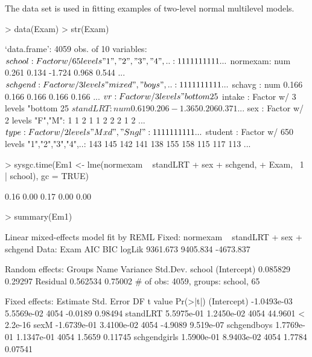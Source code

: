 \documentclass[12pt]{article}
\begin{document}
The  data set is used in fitting examples of two-level
normal multilevel models.
\begin{Schunk}
\begin{Sinput}
> data(Exam)
> str(Exam)
\end{Sinput}
\begin{Soutput}
`data.frame':	4059 obs. of  10 variables:
 $ school  : Factor w/ 65 levels "1","2","3","4",..: 1 1 1 1 1 1 1 1 1 1 ...
 $ normexam: num   0.261  0.134 -1.724  0.968  0.544 ...
 $ schgend : Factor w/ 3 levels "mixed","boys",..: 1 1 1 1 1 1 1 1 1 1 ...
 $ schavg  : num  0.166 0.166 0.166 0.166 0.166 ...
 $ vr      : Factor w/ 3 levels "bottom 25%","mi..",..: 2 2 2 2 2 2 2 2 2 2 ...
 $ intake  : Factor w/ 3 levels "bottom 25%","mi..",..: 1 2 3 2 2 1 3 2 2 3 ...
 $ standLRT: num   0.619  0.206 -1.365  0.206  0.371 ...
 $ sex     : Factor w/ 2 levels "F","M": 1 1 2 1 1 2 2 2 1 2 ...
 $ type    : Factor w/ 2 levels "Mxd","Sngl": 1 1 1 1 1 1 1 1 1 1 ...
 $ student : Factor w/ 650 levels "1","2","3","4",..: 143 145 142 141 138 155 158 115 117 113 ...
\end{Soutput}
\begin{Sinput}
> sysgc.time(Em1 <- lme(normexam ~ standLRT + sex + schgend, 
+     Exam, ~1 | school), gc = TRUE)
\end{Sinput}
\begin{Soutput}
[1] 0.16 0.00 0.17 0.00 0.00
\end{Soutput}
\begin{Sinput}
> summary(Em1)
\end{Sinput}
\begin{Soutput}
Linear mixed-effects model fit by REML
Fixed: normexam ~ standLRT + sex + schgend 
 Data: Exam 
      AIC      BIC    logLik
 9361.673 9405.834 -4673.837

Random effects:
 Groups   Name        Variance Std.Dev.
 school   (Intercept) 0.085829 0.29297 
 Residual             0.562534 0.75002 
# of obs: 4059, groups: school, 65

Fixed effects:
                Estimate  Std. Error   DF t value  Pr(>|t|)
(Intercept)  -1.0493e-03  5.5569e-02 4054 -0.0189   0.98494
standLRT      5.5975e-01  1.2450e-02 4054 44.9601 < 2.2e-16
sexM         -1.6739e-01  3.4100e-02 4054 -4.9089 9.519e-07
schgendboys   1.7769e-01  1.1347e-01 4054  1.5659   0.11745
schgendgirls  1.5900e-01  8.9403e-02 4054  1.7784   0.07541


\end{Soutput}
\end{Schunk}
\end{document}
